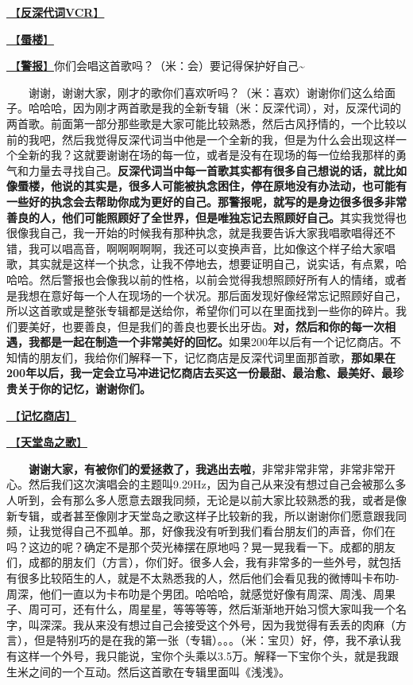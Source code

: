 \documentclass[]{ctexbook}
\begin{document}
\hyperref[senself-vcr]{🎥【\textbf{反深代词VCR}】}

\hyperref[mirage]{🎵【\textbf{蜃楼}】}

\hyperref[the-giver]{🎵【\textbf{警报}】}你们会唱这首歌吗？（米：会）要记得保护好自己\textasciitilde{}

  谢谢，谢谢大家，刚才的歌你们喜欢听吗？（米：喜欢）谢谢你们这么给面子。哈哈哈，因为刚才两首歌是我的全新专辑（米：反深代词），对，反深代词的两首歌。前面第一部分那些歌是大家可能比较熟悉，然后古风抒情的，一个比较以前的我吧，然后我觉得反深代词当中他是一个全新的我，但是为什么会出现这样一个全新的我？这就要谢谢在场的每一位，或者是没有在现场的每一位给我那样的勇气和力量去寻找自己。\textbf{反深代词当中每一首歌其实都有很多自己想说的话，就比如像蜃楼，他说的其实是，很多人可能被执念困住，停在原地没有办法动，也可能有一些好的执念会去帮助你成为更好的自己。那警报呢，就写的是身边很多很多非常善良的人，他们可能照顾好了全世界，但是唯独忘记去照顾好自己。}其实我觉得也很像我自己，我一开始的时候我有那种执念，就是我要告诉大家我唱歌唱得还不错，我可以唱高音，啊啊啊啊啊，我还可以变换声音，比如像这个样子给大家唱歌，其实就是这样一个执念，让我不停地去，想要证明自己，说实话，有点累，哈哈哈。然后警报也会像我以前的性格，以前会觉得我想照顾好所有人的情绪，或者是我想在意好每一个人在现场的一个状况。那后面发现好像经常忘记照顾好自己，所以这首歌或是整张专辑都是送给你，希望你们可以在里面找到一些你的碎片。我们要美好，也要善良，但是我们的善良也要长出牙齿。\textbf{对，然后和你的每一次相遇，我都是一起在制造一个非常美好的回忆。}如果200年以后有一个记忆商店。不知情的朋友们，我给你们解释一下，记忆商店是反深代词里面那首歌，\textbf{那如果在200年以后，我一定会立马冲进记忆商店去买这一份最甜、最治愈、最美好、最珍贵关于你的记忆，谢谢你们。}

\hyperref[the-memory-store]{🎵【\textbf{记忆商店}】}

\hyperref[haven-song]{🎵【\textbf{天堂岛之歌}】}

  \textbf{谢谢大家，有被你们的爱拯救了，我逃出去啦}，非常非常非常，非常非常开心。然后我们这次演唱会的主题叫9.29Hz，因为自己从来没有想过自己会被那么多人听到，会有那么多人愿意去跟我同频，无论是以前大家比较熟悉的我，或者是像新专辑，或者甚至像刚才天堂岛之歌这样子比较新的我，所以谢谢你们愿意跟我同频，让我觉得自己不孤单。那，好像我没有听到我们看台朋友们的声音，你们在吗？这边的呢？确定不是那个荧光棒摆在原地吗？晃一晃我看一下。成都的朋友们，成都的朋友们（方言），你们好。很多人会，我有非常多的一些外号，就包括有很多比较陌生的人，就是不太熟悉我的人，然后他们会看见我的微博叫卡布叻-周深，他们一直以为卡布叻是个男团。哈哈哈，就感觉好像有周深、周浅、周果子、周可可，还有什么，周星星，等等等等，然后渐渐地开始习惯大家叫我一个名字，叫深深。我从来没有想过自己会接受这个外号，因为我觉得有丢丢的肉麻（方言），但是特别巧的是在我的第一张（专辑）。。。（米：宝贝）好，停，我不承认我有这样一个外号，我只能说，宝你个头乘以3.5万。解释一下宝你个头，就是我跟生米之间的一个互动。然后这首歌在专辑里面叫《浅浅》。
\end{document}
